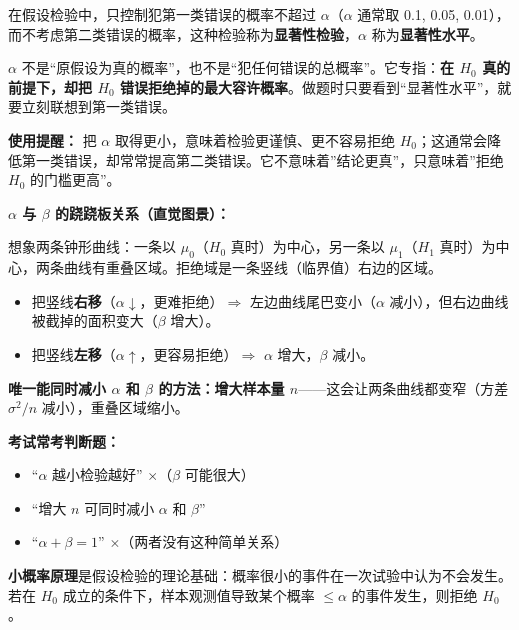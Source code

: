 ﻿\documentclass[lang=cn,11pt]{elegantbook}
\begin{document}
\begin{definition}[显著性水平与显著性检验] \label{def:significance-level}
在假设检验中，只控制犯第一类错误的概率不超过 \(\alpha\)（\(\alpha\) 通常取 0.1, 0.05, 0.01），而不考虑第二类错误的概率，这种检验称为\textbf{显著性检验}，\(\alpha\) 称为\textbf{显著性水平}。
\end{definition}

\begin{note}
\(\alpha\) 不是“原假设为真的概率”，也不是“犯任何错误的总概率”。它专指：\textbf{在 \(H_0\) 真的前提下，却把 \(H_0\) 错误拒绝掉的最大容许概率}。做题时只要看到“显著性水平”，就要立刻联想到第一类错误。
\end{note}

\begin{note}
\textbf{使用提醒：} 把 \(\alpha\) 取得更小，意味着检验更谨慎、更不容易拒绝 \(H_0\)；这通常会降低第一类错误，却常常提高第二类错误。它不意味着”结论更真”，只意味着”拒绝 \(H_0\) 的门槛更高”。
\end{note}

\begin{note}
\textbf{$\alpha$ 与 $\beta$ 的跷跷板关系（直觉图景）：}

想象两条钟形曲线：一条以 $\mu_0$（$H_0$ 真时）为中心，另一条以 $\mu_1$（$H_1$ 真时）为中心，两条曲线有重叠区域。拒绝域是一条竖线（临界值）右边的区域。
\begin{itemize}
    \item 把竖线\textbf{右移}（$\alpha\downarrow$，更难拒绝）$\Longrightarrow$ 左边曲线尾巴变小（$\alpha$ 减小），但右边曲线被截掉的面积变大（$\beta$ 增大）。
    \item 把竖线\textbf{左移}（$\alpha\uparrow$，更容易拒绝）$\Longrightarrow$ $\alpha$ 增大，$\beta$ 减小。
\end{itemize}
\textbf{唯一能同时减小 $\alpha$ 和 $\beta$ 的方法：增大样本量 $n$}——这会让两条曲线都变窄（方差 $\sigma^2/n$ 减小），重叠区域缩小。

\textbf{考试常考判断题：}
\begin{itemize}
    \item “$\alpha$ 越小检验越好” $\times$（$\beta$ 可能很大）
    \item “增大 $n$ 可同时减小 $\alpha$ 和 $\beta$” \checkmark
    \item “$\alpha+\beta=1$” $\times$（两者没有这种简单关系）
\end{itemize}
\end{note}

\begin{note}
\textbf{小概率原理}是假设检验的理论基础：概率很小的事件在一次试验中认为不会发生。若在 \(H_0\) 成立的条件下，样本观测值导致某个概率 \(\leq \alpha\) 的事件发生，则拒绝 \(H_0\)。
\end{note}
\end{document}
